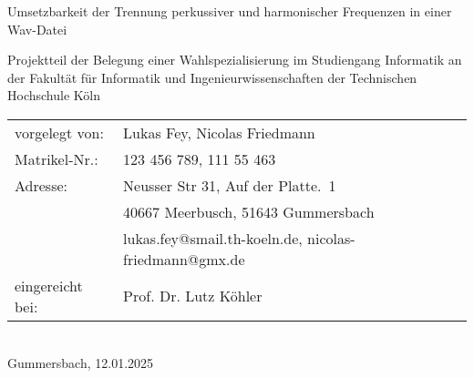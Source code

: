 \begin{titlepage}
%
\sffamily%
%
\begin{center}
\end{center}
%
\vfill
%
\begin{huge}
Umsetzbarkeit der Trennung perkussiver und harmonischer Frequenzen in einer Wav-Datei\\[10mm]
\end{huge}
%
Projektteil der Belegung einer Wahlspezialisierung\newline
im Studiengang Informatik\newline
an der Fakultät für Informatik und Ingenieurwissenschaften\newline
der Technischen Hochschule Köln
%
\vfill
%
\begin{tabular}{@{}ll}
vorgelegt von: & Lukas Fey, Nicolas Friedmann\\
Matrikel-Nr.:  & 123 456 789, 111 55 463\\
Adresse:       & Neusser Str 31, Auf der Platte.~1\\
               & 40667 Meerbusch, 51643 Gummersbach\\
               & lukas.fey@smail.th-koeln.de, nicolas-friedmann@gmx.de\\[5mm]
eingereicht bei:   & Prof. Dr. Lutz Köhler\\
\end{tabular}	
%
\\[10mm]
%
Gummersbach, 12.01.2025%
%
\rmfamily%
%
\end{titlepage}
